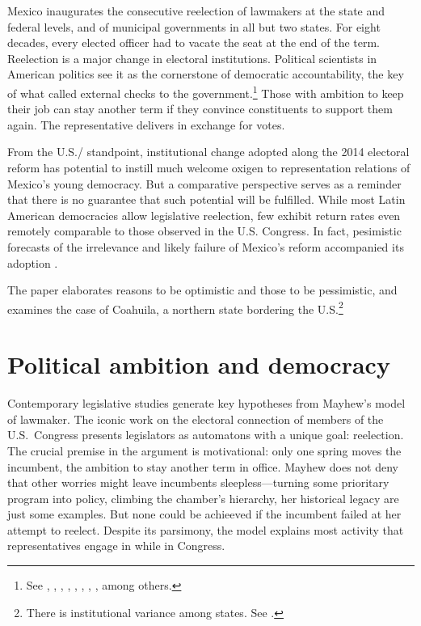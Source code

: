 \documentclass[letter,12pt]{article}
\begin{document}
\noindent Mexico inaugurates the consecutive reelection of lawmakers at the state and federal levels, and of municipal governments in all but two states.  For eight decades, every elected officer had to vacate the seat at the end of the term. Reelection is a major change in electoral institutions. Political scientists in American politics see it as the cornerstone of democratic accountability, the key of what \citet{madison.1788} called external checks to the government.\footnote{See \citet{schlesinger.1966}, \citet{mayhew.1974}, \citet{fenno.1978}, \citet{cain.etal.1987}, \citet{mccubbins.sullivan.1987}, \citet{cox.mccubbins.1993}, \citet{weingast.marshall.1988}, \citet{jacobson.1997}, among others.} Those with ambition to keep their job can stay another term if they convince constituents to support them again. The representative delivers in exchange for votes. 

From the U.S./ standpoint, institutional change adopted along the 2014 electoral reform has potential to instill much welcome oxigen to representation relations of Mexico's young democracy. But a comparative perspective serves as a reminder that there is no guarantee that such potential will be fulfilled. While most Latin American democracies allow legislative reelection, few exhibit return rates even remotely comparable to those observed in the U.S. Congress. In fact, pesimistic forecasts of the irrelevance and likely failure of Mexico's reform accompanied its adoption \citep{merinoFierroZarkin2013Blog}. 

The paper elaborates reasons to be optimistic and those to be pessimistic, and examines the case of Coahuila, a northern state bordering the U.S.\footnote{There is institutional variance among states. See \citet{magarInstReel.2017}.}

\section{Political ambition and democracy}

\noindent Contemporary legislative studies generate key hypotheses from Mayhew's \citeyearpar{mayhew.1974} model of lawmaker. The iconic work on the electoral connection of members of the U.S.\ Congress presents legislators as automatons with a unique goal: reelection. The crucial premise in the argument is motivational: only one spring moves the incumbent, the ambition to stay another term in office. Mayhew does not deny that other worries might leave incumbents sleepless---turning some prioritary program into policy, climbing the chamber's hierarchy, her historical legacy are just some examples. But none could be achieeved if the incumbent failed at her attempt to reelect. Despite its parsimony, the model explains most activity that representatives engage in while in Congress. 
\end{document}
